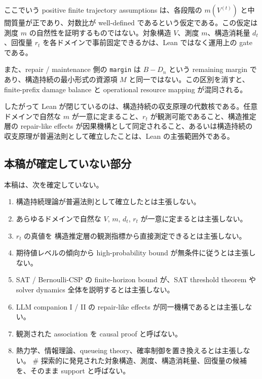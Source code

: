 \documentclass[12pt,a4paper]{article}
\begin{document}
ここでいう positive finite trajectory assumptions は、各段階の \(m(V^{(t)})\) と中間質量が正であり、対数比が well-defined であるという仮定である。この仮定は測度 \(m\) の自然性を証明するものではない。対象構造 \(V\)、測度 \(m\)、構造消耗量 \(d_{t}\)、回復量 \(r_{t}\) を各ドメインで事前固定できるかは、Lean ではなく運用上の gate である。

また、repair / maintenance 側の \texttt{margin} は \(B-D_{n}\) という remaining margin であり、構造持続の最小形式の資源項 \(M\) と同一ではない。この区別を消すと、finite-prefix damage balance と operational resource mapping が混同される。

したがって Lean が閉じているのは、構造持続の収支原理の代数核である。任意ドメインで自然な \(m\) が一意に定まること、\(r_{t}\) が観測可能であること、構造推定層の repair-like effects が因果機構として同定されること、あるいは構造持続の収支原理が普遍法則として確立したことは、Lean の主張範囲外である。

\subsection{本稿が確定していない部分}\label{ux672cux7a3fux304cux78baux5b9aux3057ux3066ux3044ux306aux3044ux90e8ux5206}

本稿は、次を確定していない。

\begin{enumerate}
\def\labelenumi{\arabic{enumi}.}
\tightlist
\item
  構造持続理論が普遍法則として確立したとは主張しない。
\item
  あらゆるドメインで自然な \(V\), \(m\), \(d_{t}\), \(r_{t}\) が一意に定まるとは主張しない。
\item
  \(r_{t}\) の真値を 構造推定層の観測指標から直接測定できるとは主張しない。
\item
  期待値レベルの傾向から high-probability bound が無条件に従うとは主張しない。
\item
  SAT / Bernoulli-CSP の finite-horizon bound が、SAT threshold theorem や solver dynamics 全体を説明するとは主張しない。
\item
  LLM companion I / II の repair-like effects が同一機構であるとは主張しない。
\item
  観測された association を causal proof と呼ばない。
\item
  熱力学、情報理論、queueing theory、確率制御を置き換えるとは主張しない。 \# 探索的に発見された対象構造、測度、構造消耗量、回復量の候補を、そのまま support と呼ばない。
\end{enumerate}
\end{document}
